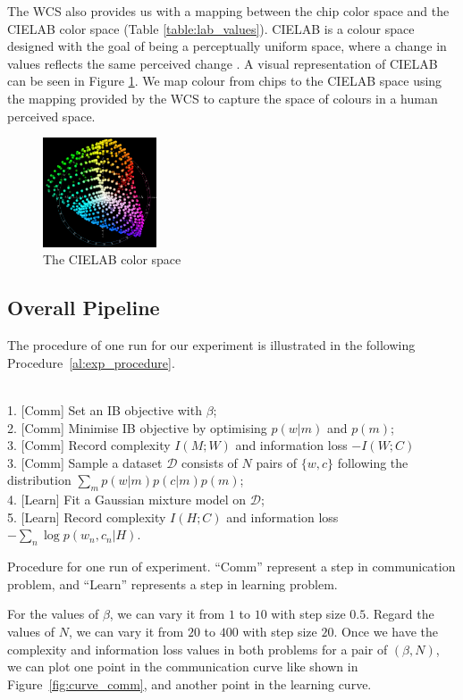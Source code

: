 \documentclass[11pt]{article}
\begin{document}
The WCS also provides us with a mapping between the chip color space and the CIELAB color space (Table \ref{table:lab_values}).
CIELAB is a colour space designed with the goal of being a perceptually uniform space, where a change in values reflects the same perceived change \cite{CIELAB}.
A visual representation of CIELAB can be seen in Figure \ref{fig:cielab}.
We map colour from chips to the CIELAB space using the mapping provided by the WCS to capture the space of colours in a human perceived space.


\begin{figure}[h]
    \centering
    \includegraphics[width=0.3\textwidth]{docs/intro_rate_distortion/graphs/CIELAB_color_space_top_view.png}
    \caption{The CIELAB color space}
    \label{fig:cielab}
\end{figure}


\subsection{Overall Pipeline}
\label{ssec:overall_pipeling}

The procedure of one run for our experiment is illustrated in the following Procedure~\ref{al:exp_procedure}.

\begin{algorithm}[h]
    \SetAlgoLined
     \\
    1. [Comm] Set an IB objective with $\beta$; \\
    2. [Comm] Minimise IB objective by optimising $p(w|m)$ and $p(m)$; \\
    3. [Comm] Record complexity $I(M;W)$ and information loss $-I(W;C)$ \\
    3. [Comm] Sample a dataset $\mathcal{D}$ consists of $N$ pairs of $\{w,c\}$ following the distribution $\sum_m p(w|m)p(c|m)p(m)$; \\
    4. [Learn] Fit a Gaussian mixture model on $\mathcal{D}$; \\
    5. [Learn] Record complexity $I(H;C)$ and information loss $-\sum_n\log p(w_n,c_n|H)$.
 \caption{Procedure for one run of experiment. ``Comm'' represent a step in communication problem, and ``Learn'' represents a step in learning problem.}
 \label{al:exp_procedure}
\end{algorithm}

For the values of $\beta$, we can vary it from $1$ to $10$ with step size $0.5$. 
Regard the values of $N$, we can vary it from $20$ to $400$ with step size $20$.
Once we have the complexity and information loss values in both problems for a pair of $(\beta, N)$, we can plot one point in the communication curve like shown in Figure~\ref{fig:curve_comm}, and another point in the learning curve.



\end{document}
